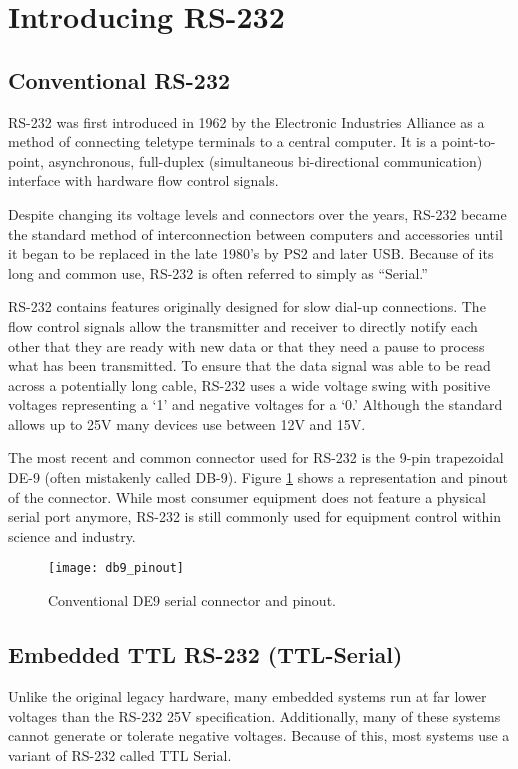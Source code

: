\documentclass[openany,11pt,fleqn]{book} %
\begin{document}
\section{Introducing RS-232}
\subsection{Conventional RS-232}
RS-232 was first introduced in 1962 by the Electronic Industries Alliance as a method of connecting teletype terminals to a central computer. It is a point-to-point, asynchronous, full-duplex (simultaneous bi-directional communication) interface with hardware flow control signals. 

Despite changing its voltage levels and connectors over the years, RS-232 became the standard method of interconnection between computers and accessories until it began to be replaced in the late 1980's by PS2 and later USB. Because of its long and common use, RS-232 is often referred to simply as ``Serial.'' 

RS-232 contains features originally designed for slow dial-up connections. The flow control signals allow the transmitter and receiver to directly notify each other that they are ready with new data or that they need a pause to process what has been transmitted. To ensure that the data signal was able to be read across a potentially long cable, RS-232 uses a wide voltage swing with positive voltages representing a `1' and negative voltages for a `0.' Although the standard allows up to {\textpm}25V many devices use between {\textpm}12V and {\textpm}15V.

The most recent and common connector used for RS-232 is the 9-pin trapezoidal DE-9 (often mistakenly called DB-9). Figure \ref{db9_pinout} shows a representation and pinout of the connector. While most consumer equipment does not feature a physical serial port anymore, RS-232 is still commonly used for equipment control within science and industry.  


\begin{figure}[]
    \centering\texttt{[image: db9\_pinout]}
    \caption{Conventional DE9 serial connector and pinout.}
    \label{db9_pinout}
\end{figure} 

\subsection{Embedded TTL RS-232 (TTL-Serial)}
Unlike the original legacy hardware, many embedded systems run at far lower voltages than the  RS-232 {\textpm}25V specification. Additionally, many of these systems cannot generate or tolerate negative voltages. Because of this, most systems use a variant of RS-232 called TTL Serial.
\end{document}

